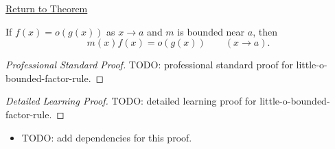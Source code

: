 \newpage
{}
\label{prf:little-o-bounded-factor-rule}

\begin{remark*}[Return]
\hyperref[prop:little-o-bounded-factor-rule]{Return to Theorem}
\end{remark*}

\begin{proposition*}
If $f(x)=o(g(x))$ as $x\to a$ and $m$ is bounded near $a$, then
\[
  m(x)f(x)=o(g(x))\qquad (x\to a).
\]
\end{proposition*}

\begin{proof}[Professional Standard Proof]
\LRAProofBodyStart
TODO: professional standard proof for little-o-bounded-factor-rule.
\end{proof}

\begin{proof}[Detailed Learning Proof]
\LRAProofBodyStart
TODO: detailed learning proof for little-o-bounded-factor-rule.
\end{proof}

\begin{remark*}
\end{remark*}

\begin{dependencies}
\begin{itemize}
  \item TODO: add dependencies for this proof.
\end{itemize}
\end{dependencies}

\clearpage
